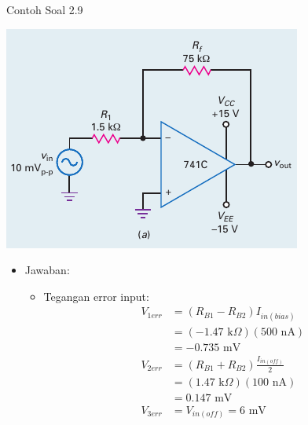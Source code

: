 \begin{frame}{Contoh Soal 2.9}
	\begin{multicols}{2}
		\begin{center}
			\includegraphics[width=\linewidth]{gambar/fig-16.17a}
		\end{center}
		\columnbreak
		\begin{itemize}
			\item Jawaban:
			\begin{itemize}
				\item Tegangan error input:
				\begin{align*}
					V_{1err} &= (R_{B1} - R_{B2})I_{in(bias)} \\
					&= ( - 1.47 \text{ k}\Omega )(500 \text{ nA}) \\
					&= -0.735 \text{ mV} \\
					V_{2err} &= (R_{B1} + R_{B2}) \frac{I_{in(off)}}{2} \\
					&= ( 1.47 \text{ k}\Omega )(100 \text{ nA}) \\
					&= 0.147 \text{ mV} \\
					V_{3err} &= V_{in(off)} = 6 \text{ mV}
				\end{align*}
			\end{itemize}
		\end{itemize}
	\end{multicols}
\end{frame}

